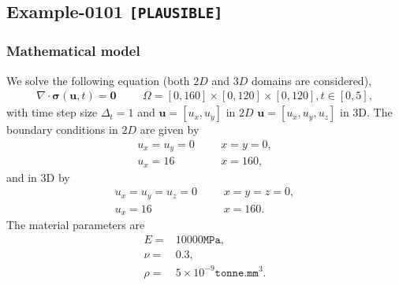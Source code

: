 %
\clearpage
%
\subsection{Example-0101 \texttt{[PLAUSIBLE]}}
%
%
\subsubsection{Mathematical model}
%
We solve the following equation (both $2D$ and $3D$ domains are considered),
%
\begin{align}
    \nabla \cdot \boldsymbol{\sigma} (\boldsymbol{u}, t) = \boldsymbol{0} & &&\Omega = [0, 160] \times [0, 120] \times [0, 120], t \in [0, 5],
\end{align}
%
with time step size $\Delta_t = 1$ and $\boldsymbol{u} = [u_x,u_y]$ in $2D$ $\boldsymbol{u} = [u_x,u_y,u_z]$ in 3D. The boundary conditions in $2D$ are given by
%
\begin{align}
    u_x = u_y = 0 & &&x = y = 0, \\
		u_x = 16 & &&x = 160,
\end{align}
%
and in 3D by
\begin{align}
    u_x = u_y = u_z =0 & &&x = y = z =0, \\
		u_x = 16 & &&x = 160.
\end{align}
The material parameters are
\begin{align}
    E = & 10000\texttt{MPa}, \\
    \nu = & 0.3, \\
		\rho = & 5 \times 10^{-9}\texttt{tonne.mm$^3$}.
\end{align}
%
%
